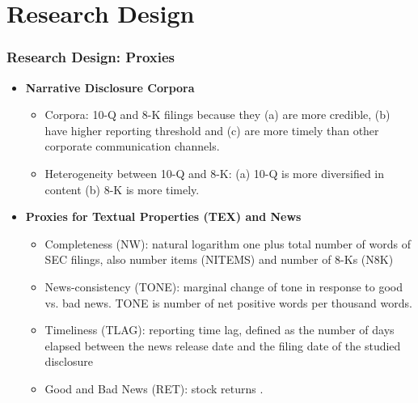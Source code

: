 \documentclass{beamer}
\begin{document}
\section{Research Design}
\begin{frame}
\frametitle{Research Design: Proxies}
\begin{itemize}

\item \textbf{Narrative Disclosure Corpora}

	\begin{itemize}
		\item Corpora: 10-Q and 8-K filings because they (a) are more credible, (b) have higher reporting threshold and (c) are more timely than other corporate communication channels.
		\item Heterogeneity between 10-Q and 8-K: (a) 10-Q is more diversified in content (b) 8-K is more timely.
	\end{itemize}

\medskip
\pause

\item \textbf{Proxies for Textual Properties (TEX) and News}
	\begin{itemize}
		\item Completeness (NW): natural logarithm one plus total number of words of SEC filings, also number items (NITEMS) and number of 8-Ks (N8K) \pause
		\item News-consistency (TONE): marginal change of tone in response to  good vs. bad news. TONE is number of net positive words per thousand words. \pause
		\item Timeliness (TLAG): reporting time lag, defined as the number of days elapsed between the news release date and the filing date of the studied disclosure \pause
		\item Good and Bad News (RET): stock returns \citep{basuConservatismPrincipleAsymmetric1997}.
	\end{itemize}

\end{itemize}
\end{frame}
\end{document}
